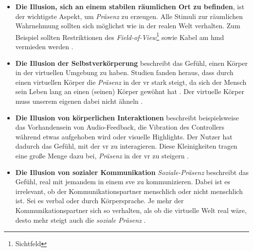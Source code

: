 \documentclass[a4paper,11pt]{article}%
\renewcommand{\\}{\vspace*{0.5\baselineskip} \newline}
\begin{document}
\begin{itemize}
	\item{\textbf{Die Illusion, sich an einem stabilen räumlichen Ort zu befinden}}, ist der wichtigste Aspekt, um \textit{Präsenz} zu erzeugen. Alle Stimuli zur räumlichen Wahrnehmung sollten sich möglichst wie in der realen Welt verhalten. Zum Beispiel sollten Restriktionen des  \textit{Field-of-View}\footnote{Sichtfeld} sowie Kabel am \ac{hmd} vermieden werden \citep[S.47]{jerald2015vr}.
	\item{\textbf{Die Illusion der Selbstverkörperung}} beschreibt das Gefühl, einen Körper in der virtuellen Umgebung zu haben. Studien fanden heraus, dass durch einen virtuellen Körper die \textit{Präsenz} in der \ac{vr} stark steigt, da sich der Mensch sein Leben lang an einen (seinen) Körper gewöhnt hat \citep[S.756]{botvinick1998rubber}. Der virtuelle Körper muss unserem eigenen dabei nicht ähneln \citep[S.7]{maxwell1960psycho}.
	\item{\textbf{Die Illusion von körperlichen Interaktionen}} beschreibt beispielsweise das Vorhandensein von Audio-Feedback, die Vibration des Controllers während etwas aufgehoben wird oder visuelle Highlights. Der Nutzer hat dadurch das Gefühl, mit der \ac{vr} zu interagieren. Diese Kleinigkeiten tragen eine große Menge dazu bei, \textit{Präsenz} in der \ac{vr} zu steigern \citep[S.48]{jerald2015vr}.
	\item{\textbf{Die Illusion von sozialer Kommunikation}} \textit{Soziale-Präsenz} beschreibt das Gefühl, real mit jemandem in einem \ac{sve} zu kommunizieren. Dabei ist es irrelevant, ob der Kommunikationspartner menschlich oder nicht menschlich ist. Sei es verbal oder durch Körpersprache. Je mehr der Kommunikationspartner sich so verhalten, als ob die virtuelle Welt real wäre, desto mehr steigt auch die \textit{soziale Präsenz} \citep[S.49]{jerald2015vr} \citep[S.12]{guadagno2007virtual}.
\end{itemize}

\end{document}
